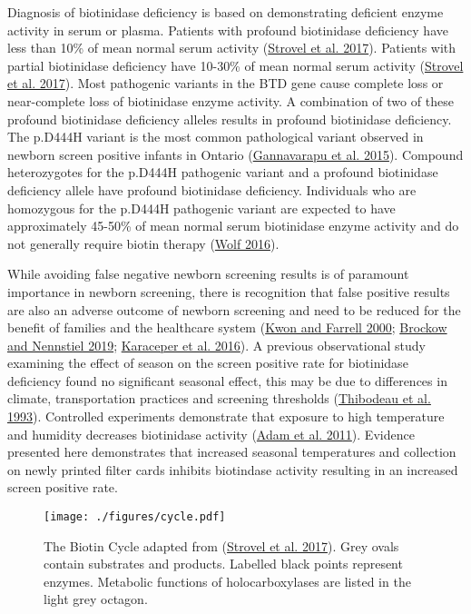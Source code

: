 \documentclass[review]{elsarticle}
\begin{document}
Diagnosis of biotinidase deficiency is based on demonstrating
deficient enzyme activity in serum or plasma. Patients with profound
biotinidase deficiency have less than 10\% of mean normal serum
activity (\hyperlink{citeproc_bib_item_10}{Strovel et al. 2017}). Patients with partial biotinidase
deficiency have 10-30\% of mean normal serum activity (\hyperlink{citeproc_bib_item_10}{Strovel et al. 2017}). Most pathogenic variants in the BTD gene cause
complete loss or near-complete loss of biotinidase enzyme activity. A
combination of two of these profound biotinidase deficiency alleles
results in profound biotinidase deficiency. The p.D444H variant is the
most common pathological variant observed in newborn screen positive
infants in Ontario (\hyperlink{citeproc_bib_item_5}{Gannavarapu et al. 2015}). Compound heterozygotes for
the p.D444H pathogenic variant and a profound biotinidase deficiency
allele have profound biotinidase deficiency. Individuals who are
homozygous for the p.D444H pathogenic variant are expected to have
approximately 45-50\% of mean normal serum biotinidase enzyme activity
and do not generally require biotin therapy (\hyperlink{citeproc_bib_item_16}{Wolf 2016}).

While avoiding false negative newborn screening results is of
paramount importance in newborn screening, there is recognition that
false positive results are also an adverse outcome of newborn
screening and need to be reduced for the benefit of families and the
healthcare system (\hyperlink{citeproc_bib_item_7}{Kwon and Farrell 2000}; \hyperlink{citeproc_bib_item_2}{Brockow and Nennstiel 2019}; \hyperlink{citeproc_bib_item_6}{Karaceper et al. 2016}). A
previous observational study examining the effect of season on the
screen positive rate for biotinidase deficiency found no significant
seasonal effect, this may be due to differences in climate,
transportation practices and screening thresholds (\hyperlink{citeproc_bib_item_12}{Thibodeau et al. 1993}). Controlled experiments demonstrate that
exposure to high temperature and humidity decreases biotinidase
activity (\hyperlink{citeproc_bib_item_1}{Adam et al. 2011}). Evidence presented here demonstrates that
increased seasonal temperatures and collection on newly printed filter
cards inhibits biotindase activity resulting in an increased screen
positive rate.



\begin{figure}[htbp]
\centering
\texttt{[image: ./figures/cycle.pdf]}
\caption{\label{fig:org4da7ef7}The Biotin Cycle adapted from (\hyperlink{citeproc_bib_item_10}{Strovel et al. 2017}). Grey ovals contain substrates and products. Labelled black points represent enzymes. Metabolic functions of holocarboxylases are listed in the light grey octagon.}
\end{figure}
\end{document}
